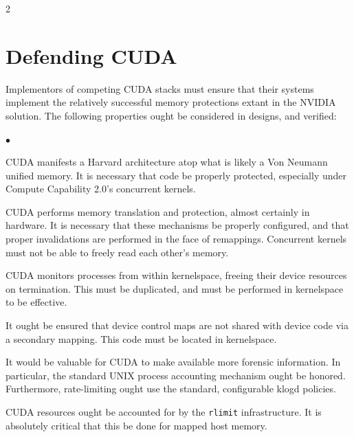 \documentclass[letterpaper,10pt]{article}
\newcommand{\squishlist}{\begin{list}{$\bullet$}
  {\setlength{\itemsep}{0pt}
    \setlength{\parsep}{3pt}
    \setlength{\topsep}{3pt}
    \setlength{\partopsep}{0pt}
    \setlength{\leftmargin}{1.5em}
    \setlength{\labelwidth}{1em}
    \setlength{\labelsep}{0.5em}
  } }
\newcommand{\squishend}{\end{list}}
\begin{document}
\begin{multicols}{2}
\section{Defending CUDA}
Implementors of competing CUDA stacks must ensure that their systems implement
the relatively successful memory protections extant in the NVIDIA solution. The
following properties ought be considered in designs, and verified:
\squishlist
\item CUDA manifests a Harvard architecture atop what is likely a Von Neumann
unified memory. It is necessary that code be properly protected, especially
under Compute Capability 2.0's concurrent kernels.
\item CUDA performs memory translation and protection, almost certainly in
hardware. It is necessary that these mechanisms be properly configured,
and that proper invalidations are performed in the face of remappings. Concurrent
kernels must not be able to freely read each other's memory.
\item CUDA monitors processes from within kernelspace, freeing their device
resources on termination. This must be duplicated, and must be performed in
kernelspace to be effective.
\item It ought be ensured that device control maps are not shared with device
code via a secondary mapping. This code must be located in kernelspace.
\item It would be valuable for CUDA to make available more forensic information.
In particular, the standard UNIX process accounting mechanism ought be honored.
Furthermore, rate-limiting ought use the standard, configurable klogd policies.
\item CUDA resources ought be accounted for by the \texttt{rlimit} infrastructure.
It is absolutely critical that this be done for mapped host memory.
\squishend

\end{multicols}
\end{document}
